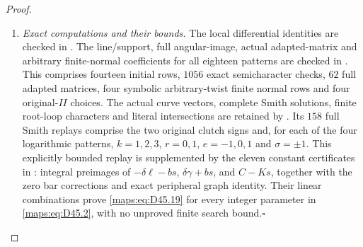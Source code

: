 \begin{proof}
\begin{enumerate}[label=\arabic*.,leftmargin=*]
\item \emph{Exact computations and their bounds.}
The local differential identities are checked in
.
The line/support, full angular-image, actual
adapted-matrix and arbitrary finite-normal
coefficients for all eighteen patterns are checked in
.
This comprises fourteen initial rows, $1056$ exact
semicharacter checks, $62$ full adapted matrices,
four symbolic arbitrary-twist finite normal rows
and four original-$II$ choices.
The actual curve vectors, complete Smith solutions,
finite root-loop characters and literal intersections
are retained by
.
Its $158$ full Smith replays comprise the two original
clutch signs and, for each of the four logarithmic
patterns, $k=1,2,3$, $r=0,1$, $e=-1,0,1$ and
$\sigma=\pm1$. This explicitly bounded replay is
supplemented by the eleven constant certificates in
:
integral preimages of $-\delta\ell-bs$,
$\delta\gamma+bs$, and $C-Ks$, together with the
zero bar corrections and exact peripheral graph
identity. Their linear combinations prove \eqref{maps:eq:D45.19}
for every integer parameter in \eqref{maps:eq:D45.2}, with no
unproved finite search bound.\hfill$\square$
\end{enumerate}
\end{proof}


